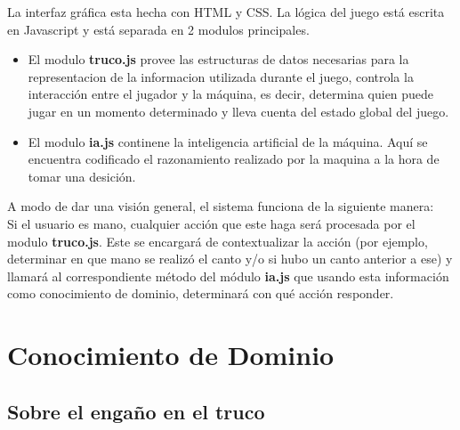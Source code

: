 \documentclass[12pt,a4paper]{article}
\begin{document}
La interfaz gr\'afica esta hecha con HTML y CSS. La l\'ogica del juego est\'a escrita en Javascript y est\'a separada en 2 modulos principales.  
\begin{itemize}
\item El modulo \textbf{truco.js} provee las estructuras de datos necesarias para la representacion de la informacion utilizada durante el juego,
controla la interacci\'on entre el jugador y la m\'aquina, es decir, determina quien puede jugar en un momento determinado y lleva cuenta del
estado global del juego.

\item El modulo \textbf{ia.js} continene la inteligencia artificial de la m\'aquina. Aqu\'i se encuentra codificado el razonamiento realizado por la maquina
a la hora de tomar una desici\'on.

\end{itemize}

A modo de dar una visi\'on general, el sistema funciona de la siguiente manera: \\
Si el usuario es mano, cualquier acci\'on que este haga ser\'a procesada por el modulo \textbf{truco.js}. Este se encargar\'a de contextualizar la
acci\'on (por ejemplo, determinar en que mano se realiz\'o el canto y/o si hubo un canto anterior a ese) y llamar\'a al correspondiente m\'etodo del
m\'odulo \textbf{ia.js} que usando esta informaci\'on como conocimiento de dominio, determinar\'a con qu\'e acci\'on responder.



\section{Conocimiento de Dominio}

\subsection{Sobre el enga\~no en el truco}
\end{document}
